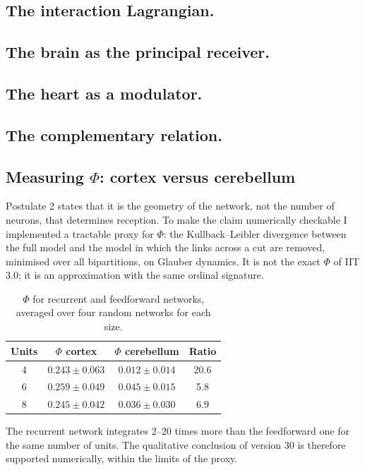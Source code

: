\subsection{The interaction Lagrangian.}
\subsection{The brain as the principal receiver.}
\subsection{The heart as a modulator.}
\subsection{The complementary relation.}

\subsection{Measuring \texorpdfstring{$\Phi$}{Phi}: cortex versus cerebellum}
Postulate 2 states that it is the geometry of the network, not the number of neurons, that determines reception. To make the claim numerically checkable I implemented a tractable proxy for $\Phi$: the Kullback--Leibler divergence between the full model and the model in which the links across a cut are removed, minimised over all bipartitions, on Glauber dynamics. It is not the exact $\Phi$ of IIT 3.0; it is an approximation with the same ordinal signature.

\begin{table}[H]
\centering
\begin{tabular}{@{}cccc@{}}
\toprule
Units & $\Phi$ cortex & $\Phi$ cerebellum & Ratio \\ \midrule
4 & $0.243 \pm 0.063$ & $0.012 \pm 0.014$ & 20.6 \\
6 & $0.259 \pm 0.049$ & $0.045 \pm 0.015$ & 5.8 \\
8 & $0.245 \pm 0.042$ & $0.036 \pm 0.030$ & 6.9 \\ \bottomrule
\end{tabular}
\caption{$\Phi$ for recurrent and feedforward networks, averaged over four random networks for each size.}
\label{tab:phi}
\end{table}

The recurrent network integrates 2--20 times more than the feedforward one for the same number of units. The qualitative conclusion of version 30 is therefore supported numerically, within the limits of the proxy.

